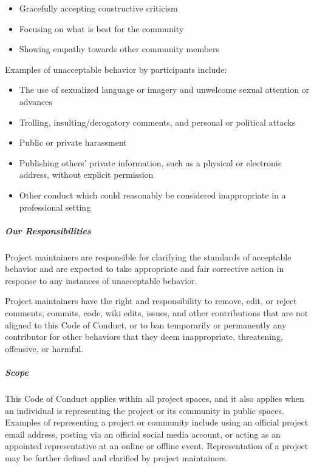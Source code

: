 \documentclass[letterpaper,10pt,english,openany,oneside]{sphinxmanual}
\begin{document}
{{{{\begin{itemize}
\item {} 
\sphinxAtStartPar
Gracefully accepting constructive criticism

\item {} 
\sphinxAtStartPar
Focusing on what is best for the community

\item {} 
\sphinxAtStartPar
Showing empathy towards other community members

\end{itemize}

\sphinxAtStartPar
Examples of unacceptable behavior by participants include:
\begin{itemize}
\item {} 
\sphinxAtStartPar
The use of sexualized language or imagery and unwelcome sexual attention or
advances

\item {} 
\sphinxAtStartPar
Trolling, insulting/derogatory comments, and personal or political attacks

\item {} 
\sphinxAtStartPar
Public or private harassment

\item {} 
\sphinxAtStartPar
Publishing others’ private information, such as a physical or electronic
address, without explicit permission

\item {} 
\sphinxAtStartPar
Other conduct which could reasonably be considered inappropriate in a
professional setting

\end{itemize}


\subparagraph{Our Responsibilities}
\label{\detokenize{development/CODE_OF_CONDUCT:our-responsibilities}}
\sphinxAtStartPar
Project maintainers are responsible for clarifying the standards of acceptable
behavior and are expected to take appropriate and fair corrective action in
response to any instances of unacceptable behavior.

\sphinxAtStartPar
Project maintainers have the right and responsibility to remove, edit, or
reject comments, commits, code, wiki edits, issues, and other contributions
that are not aligned to this Code of Conduct, or to ban temporarily or
permanently any contributor for other behaviors that they deem inappropriate,
threatening, offensive, or harmful.


\subparagraph{Scope}
\label{\detokenize{development/CODE_OF_CONDUCT:scope}}
\sphinxAtStartPar
This Code of Conduct applies within all project spaces, and it also applies when
an individual is representing the project or its community in public spaces.
Examples of representing a project or community include using an official
project e\sphinxhyphen{}mail address, posting via an official social media account, or acting
as an appointed representative at an online or offline event. Representation of
a project may be further defined and clarified by project maintainers.


}}}}
\end{document}
